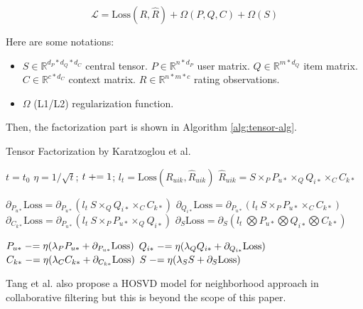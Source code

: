 \documentclass[letter paper, 11pt]{article}
\begin{document}
	\begin{equation}
		\label{eqn:tensor-obj}
		\mathcal{L} = \text{Loss}(R, \hat{R}) +  \Omega(P, Q, C) + \Omega(S)
	\end{equation}
	
	Here are some notations: 
	\begin{itemize}
		\item $S\in \mathbb{R}^{d_P*d_Q*d_C}$ central tensor. $P \in \mathbb{R}^{n*d_P}$ user matrix. $Q \in \mathbb{R}^{m*d_Q}$ item matrix. $C\in \mathbb{R}^{c*d_C}$ context matrix. $R \in \mathbb{R}^{n * m * c}$ rating observations.
		
		\item $\Omega$ (L1/L2) regularization function.
	\end{itemize}

	Then, the factorization part is shown in Algorithm \ref{alg:tensor-alg}.
	
	\begin{algorithm}[h]
		\caption{Tensor Factorization by Karatzoglou et al.\cite{tensor}}
		\label{alg:tensor-alg}
		\begin{algorithmic}
			\STATE $t = t_0$
				\STATE $\eta = 1/\sqrt{t}$; $t \mathrel{+}= 1$; $l_t = \text{Loss}(R_{uik}, \hat{R}_{uik})$
				\STATE $\hat{R}_{uik} = S \times_P P_{u*} \times_Q Q_{i*} \times_C C_{k*}$
				
				\STATE $\partial_{P_{u*}} \text{Loss} = \partial_{P_{u*}} (l_t\ S \times_Q Q_{i*} \times_C C_{k*})$
				\STATE $\partial_{Q_{i*}} \text{Loss} = \partial_{P_{u*}} (l_t\ S \times_P P_{u*} \times_C C_{k*})$
				\STATE $\partial_{C_{k*}} \text{Loss} = \partial_{P_{u*}} (l_t\ S \times_P P_{u*} \times_Q Q_{i*})$
				\STATE $\partial_{S} \text{Loss} = \partial_{S} (l_t\ \bigotimes P_{u*} \bigotimes Q_{i*} \bigotimes C_{k*})$
												
				\STATE $P_{u*} \mathrel{-}= \eta(\lambda_P P_{u*} + \partial_{P_{u*}} \text{Loss})$
				\STATE $Q_{i*} \mathrel{-}= \eta(\lambda_Q Q_{i*} + \partial_{Q_{i*}} \text{Loss})$
				\STATE $C_{k*} \mathrel{-}= \eta(\lambda_C C_{k*} + \partial_{C_{k*}} \text{Loss})$
				\STATE $S \mathrel{-}= \eta(\lambda_S S + \partial_{S} \text{Loss})$
			\ENDWHILE
		\end{algorithmic}
	\end{algorithm}

	Tang et al. also propose a HOSVD model for neighborhood approach in collaborative filtering \cite{tensor-neighbor} but this is beyond the scope of this paper.
	
\end{document}

